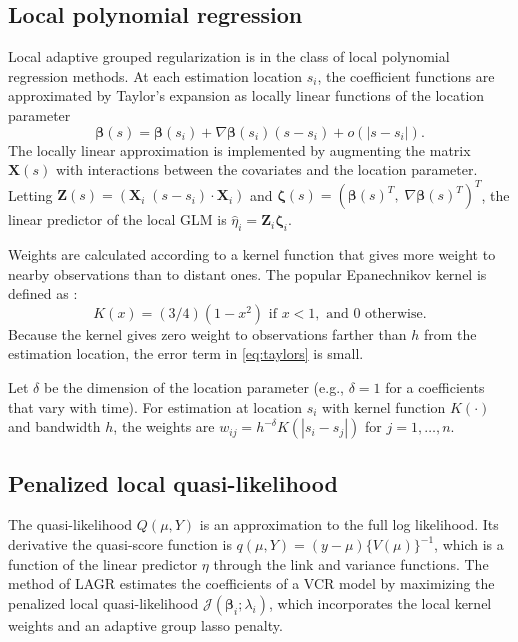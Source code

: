\subsection{Local polynomial regression}
Local adaptive grouped regularization is in the class of local polynomial regression methods. At each estimation location $s_i$, the coefficient functions are approximated by Taylor's expansion as locally linear functions of the location parameter
\begin{equation}\label{eq:taylors}
\bm{\beta}(s) = \bm{\beta}(s_i) + \nabla \bm{\beta}(s_i) (s - s_i) + o(|s-s_i|).
\end{equation}
The locally linear approximation is implemented by augmenting the matrix $\bm{X}(s)$ with interactions between the covariates and the location parameter. Letting $\bm{Z}(s) = \left( \bm{X}_i \; (s-s_i)\cdot\bm{X}_i \right)$ and $\bm{\zeta}(s) = (\bm{\beta}(s)^T, \; \nabla \bm{\beta}(s)^T)^T$, the linear predictor of the local GLM is $\hat{\eta}_i = \bm{Z}_i \bm{\zeta}_i$.

Weights are calculated according to a kernel function that gives more weight to nearby observations than to distant ones. The popular Epanechnikov kernel is defined as \citep{Samiuddin-el-Sayyad-1990}:
\begin{equation*}
K(x) = (3/4) (1-x^2) \text{ if } x<1, \text{ and } 0 \text{ otherwise}.
\end{equation*}
Because the kernel gives zero weight to observations farther than $h$ from the estimation location, the error term in \eqref{eq:taylors} is small.

Let $\delta$ be the dimension of the location parameter (e.g., $\delta=1$ for a coefficients that vary with time). For estimation at location $s_i$ with kernel function $K(\cdot)$ and bandwidth $h$, the weights are $w_{ij} = h^{-\delta} K(|s_i-s_j|)$ for $j = 1, \dots, n$. 

\subsection{Penalized local quasi-likelihood}
The quasi-likelihood $Q(\mu, Y)$ is an approximation to the full log likelihood. Its derivative the quasi-score function is $q(\mu, Y) = (y-\mu) \{V(\mu)\}^{-1}$, which is a function of the linear predictor $\eta$ through the link and variance functions. The method of LAGR estimates the coefficients of a VCR model by maximizing the penalized local quasi-likelihood $\mathcal{J}(\bm{\beta}_i; \lambda_i)$, which incorporates the local kernel weights and an adaptive group lasso penalty. 

